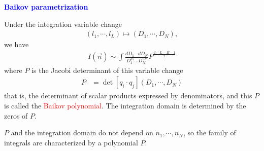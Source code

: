 \documentclass[10pt]{article}
\begin{document}
\textbf{\textcolor{blue}{Baikov parametrization}}

Under the integration variable change
\begin{align*}
(l_1, \cdots, l_L) \mapsto (D_1, \cdots, D_N),
\end{align*}
we have
\begin{align*}
I(\vec{n}) \sim \int \frac{d D_1 \cdots dD_N}{D_1^{n_1} \cdots D_N^{n_N}} P^{\frac{d-L-E-1}{2}}
\end{align*}
where $P$ is the Jacobi determinant of this variable change
\begin{align}
\nonumber
P &= \det \left[ q_i \cdot q_j \right] (D_1,\cdots, D_N)
\end{align}
that is, the determinant of scalar products expressed by denominators, and this $P$ is called  the \textcolor{red}{Baikov polynomial}.
The integration domain is determined by the zeros of $P$.

$P$ and the integration domain do not depend on $n_1, \cdots, n_N$, so the family of integrals are characterized by a polynomial $P$.
\end{document}
